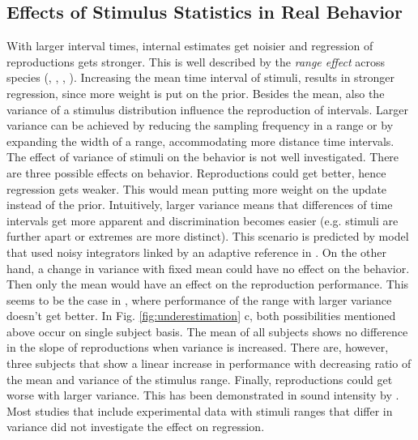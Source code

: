 \documentclass[10pt]{article}
\begin{document}
\subsection{Effects of Stimulus Statistics in Real Behavior}
With larger interval times, internal estimates get noisier and regression of reproductions gets stronger. This is well described by the \textit{range effect} across species (\cite{Cicchini2012}, \cite{Henke2021}, \cite{Henke2022}, \cite{Sohn2019}). 
Increasing the mean time interval of stimuli, results in stronger regression, since more weight is put on the prior. 
Besides the mean, also the variance of a stimulus distribution influence the reproduction of intervals.
Larger variance can be achieved by reducing the sampling frequency in a range or by expanding the width of a range, accommodating more distance time intervals. 
The effect of variance of stimuli on the behavior is not well investigated.
There are three possible effects on behavior. 
Reproductions could get better, hence regression gets weaker. This would mean putting more weight on the update instead of the prior. 
Intuitively, larger variance means that differences of time intervals get more apparent and discrimination becomes easier (e.g. stimuli are further apart or extremes are more distinct). 
This scenario is predicted by model that used noisy integrators linked by an adaptive reference in \cite{Thurley2016}.
On the other hand, a change in variance with fixed mean could have no effect on the behavior. Then only the mean would have an effect on the reproduction performance.
This seems to be the case in \cite{Petzschner2012}, where performance of the range with larger variance doesn't get better. 
In Fig. \ref{fig:underestimation} c, both possibilities mentioned above occur on single subject basis. The mean of all subjects shows no difference in the slope of reproductions when variance is increased. There are, however, three subjects that show a linear increase in performance with decreasing ratio of the mean and variance of the stimulus range. 
Finally, reproductions could get worse with larger variance. This has been demonstrated in sound intensity by \cite{Teghtsoonian78}.
Most studies that include experimental data with stimuli ranges that differ in variance did not investigate the effect on regression. 
\end{document}
